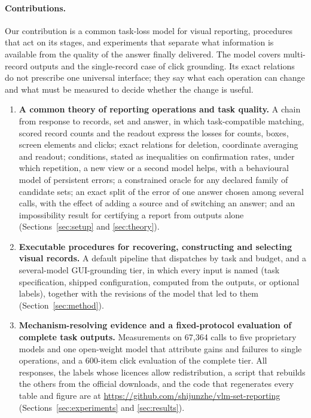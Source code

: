 \paragraph{Contributions.} Our contribution is a common task-loss model for visual reporting, procedures that act on its stages, and experiments that separate what information is available from the quality of the answer finally delivered. The model covers multi-record outputs and the single-record case of click grounding. Its exact relations do not prescribe one universal interface; they say what each operation can change and what must be measured to decide whether the change is useful.
\begin{enumerate}
\item \textbf{A common theory of reporting operations and task quality.} A chain from response to records, set and answer, in which task-compatible matching, scored record counts and the readout express the losses for counts, boxes, screen elements and clicks; exact relations for deletion, coordinate averaging and readout; conditions, stated as inequalities on confirmation rates, under which repetition, a new view or a second model helps, with a behavioural model of persistent errors; a constrained oracle for any declared family of candidate sets; an exact split of the error of one answer chosen among several calls, with the effect of adding a source and of switching an answer; and an impossibility result for certifying a report from outputs alone (Sections~\ref{sec:setup} and \ref{sec:theory}).
\item \textbf{Executable procedures for recovering, constructing and selecting visual records.} A default pipeline that dispatches by task and budget, and a several-model GUI-grounding tier, in which every input is named (task specification, shipped configuration, computed from the outputs, or optional labels), together with the revisions of the model that led to them (Section~\ref{sec:method}).
\item \textbf{Mechanism-resolving evidence and a fixed-protocol evaluation of complete task outputs.} Measurements on 67,364 calls to five proprietary models and one open-weight model that attribute gains and failures to single operations, and a 600-item click evaluation of the complete tier. All responses, the labels whose licences allow redistribution, a script that rebuilds the others from the official downloads, and the code that regenerates every table and figure are at \url{https://github.com/shijunzhe/vlm-set-reporting} (Sections~\ref{sec:experiments} and \ref{sec:results}).
\end{enumerate}
